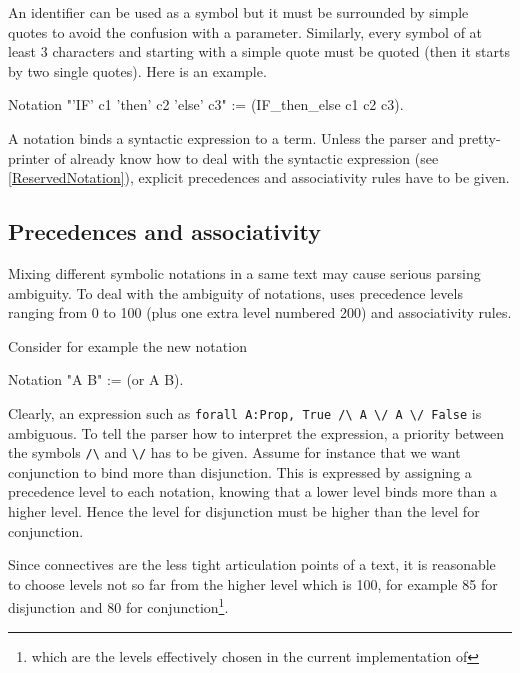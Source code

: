 An identifier can be used as a symbol but it must be surrounded by
simple quotes to avoid the confusion with a parameter. Similarly,
every symbol of at least 3 characters and starting with a simple quote
must be quoted (then it starts by two single quotes). Here is an example.

\begin{coq_example*}
Notation "'IF' c1 'then' c2 'else' c3" := (IF_then_else c1 c2 c3).
\end{coq_example*}


A notation binds a syntactic expression to a term. Unless the parser
and pretty-printer of {\Coq} already know how to deal with the
syntactic expression (see \ref{ReservedNotation}), explicit precedences and
associativity rules have to be given.

\subsection[Precedences and associativity]{Precedences and associativity
}

Mixing different symbolic notations in a same text may cause serious
parsing ambiguity. To deal with the ambiguity of notations, {\Coq}
uses precedence levels ranging from 0 to 100 (plus one extra level
numbered 200) and associativity rules.

Consider for example the new notation

\begin{coq_example*}
Notation "A \/ B" := (or A B).
\end{coq_example*}

Clearly, an expression such as {\tt forall A:Prop, True \verb=/\= A \verb=\/=
A \verb=\/= False} is ambiguous. To tell the {\Coq} parser how to
interpret the expression, a priority between the symbols \verb=/\= and
\verb=\/= has to be given. Assume for instance that we want conjunction
to bind more than disjunction. This is expressed by assigning a
precedence level to each notation, knowing that a lower level binds
more than a higher level.  Hence the level for disjunction must be
higher than the level for conjunction.

Since connectives are the less tight articulation points of a text, it
is reasonable to choose levels not so far from the higher level which
is 100, for example 85 for disjunction and 80 for
conjunction\footnote{which are the levels effectively chosen in the
current implementation of {\Coq}}.

